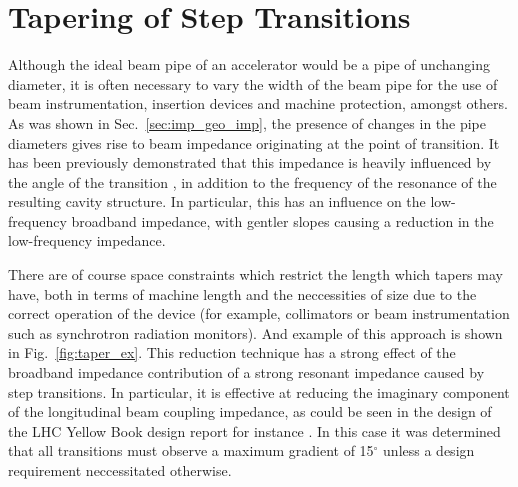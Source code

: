 \section{Tapering of Step Transitions}
\label{sec:step_ins}

Although the ideal beam pipe of an accelerator would be a pipe of unchanging diameter, it is often necessary to vary the width of the beam pipe for the use of beam instrumentation, insertion devices and machine protection, amongst others. As was shown in Sec.~\ref{sec:imp_geo_imp}, the presence of changes in the pipe diameters gives rise to beam impedance originating at the point of transition. It has been previously demonstrated that this impedance is heavily influenced by the angle of the transition \cite{Podobedov:TaperedImp}, in addition to the frequency of the resonance of the resulting cavity structure. In particular, this has an influence on the low-frequency broadband impedance, with gentler slopes causing a reduction in the low-frequency impedance. 

There are of course space constraints which restrict the length which tapers may have, both in terms of machine length and the neccessities of size due to the correct operation of the device (for example, collimators or beam instrumentation such as synchrotron radiation monitors). And example of this approach is shown in Fig.~\ref{fig:taper_ex}. This reduction technique has a strong effect of the broadband impedance contribution of a strong resonant impedance caused by step transitions. In particular, it is effective at reducing the imaginary component of the longitudinal beam coupling impedance, as could be seen in the design of the LHC Yellow Book design report for instance \cite{Ruggiero:LHCColEff}. In this case it was determined that all transitions must observe a maximum gradient of 15$^{\circ}$ unless a design requirement neccessitated otherwise.

